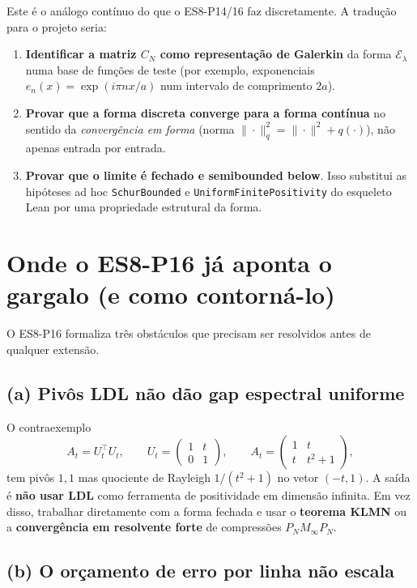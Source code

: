 \documentclass[11pt,a4paper]{article}
\theoremstyle{definition}
\theoremstyle{remark}
\newcommand{\E}{\mathcal{E}}
\begin{document}
Este é o análogo contínuo do que o ES8-P14/16 faz discretamente. A tradução
para o projeto seria:

\begin{enumerate}
  \item \textbf{Identificar a matriz \(C_N\) como representação de Galerkin}
        da forma \(\E_\lambda\) numa base de funções de teste (por exemplo,
        exponenciais \(e_n(x)=\exp(i\pi n x/a)\) num intervalo de comprimento
        \(2a\)).
  \item \textbf{Provar que a forma discreta converge para a forma contínua}
        no sentido da \emph{convergência em forma} (norma
        \(\|\cdot\|_q^2 = \|\cdot\|^2 + q(\cdot)\)), não apenas entrada por
        entrada.
  \item \textbf{Provar que o limite é fechado e semibounded below}. Isso
        substitui as hipóteses ad hoc \texttt{SchurBounded} e
        \texttt{UniformFinitePositivity} do esqueleto Lean por uma propriedade
        estrutural da forma.
\end{enumerate}

\section{Onde o ES8-P16 já aponta o gargalo (e como contorná-lo)}

O ES8-P16 formaliza três obstáculos que precisam ser resolvidos antes de
qualquer extensão.

\subsection*{(a) Pivôs LDL não dão gap espectral uniforme}

O contraexemplo
\[
A_t=U_t^\top U_t,\qquad
U_t=\begin{pmatrix}1&t\\0&1\end{pmatrix},
\qquad
A_t=\begin{pmatrix}1&t\\t&t^2+1\end{pmatrix},
\]
tem pivôs \(1,1\) mas quociente de Rayleigh \(1/(t^2+1)\) no vetor \((-t,1)\).
A saída é \textbf{não usar LDL} como ferramenta de positividade em dimensão
infinita. Em vez disso, trabalhar diretamente com a forma fechada e usar o
\textbf{teorema KLMN} ou a \textbf{convergência em resolvente forte} de
compressões \(P_N M_\infty P_N\).

\subsection*{(b) O orçamento de erro por linha não escala}
\end{document}
